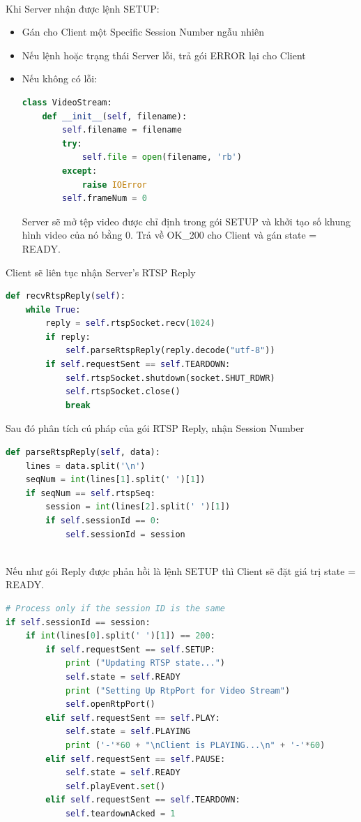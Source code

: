 \documentclass[a4paper]{article}
\begin{document}
\\
Khi Server nhận được lệnh SETUP:
\begin{itemize}
    \item Gán cho Client một Specific Session Number ngẫu nhiên
    \item Nếu lệnh hoặc trạng thái Server lỗi, trả gói ERROR lại cho Client
    \item Nếu không có lỗi:\\
    \begin{lstlisting}[language=Python]
class VideoStream:
    def __init__(self, filename):
        self.filename = filename
        try:
    	    self.file = open(filename, 'rb')
        except:
    	    raise IOError
        self.frameNum = 0
    \end{lstlisting}
    \tab Server sẽ mở tệp video được chỉ định trong gói SETUP và khởi tạo số khung hình video của nó bằng 0.
    \tab Trả về OK\_200 cho Client và gán state = READY.
\end{itemize}
Client sẽ liên tục nhận Server's RTSP Reply
\begin{lstlisting}[language=Python]
def recvRtspReply(self):
    while True:
        reply = self.rtspSocket.recv(1024)
        if reply:
            self.parseRtspReply(reply.decode("utf-8"))
        if self.requestSent == self.TEARDOWN:
            self.rtspSocket.shutdown(socket.SHUT_RDWR)
            self.rtspSocket.close()
            break
\end{lstlisting}
Sau đó phân tích cú pháp của gói RTSP Reply, nhận Session Number
\begin{lstlisting}[language=Python]
def parseRtspReply(self, data):
    lines = data.split('\n')
    seqNum = int(lines[1].split(' ')[1])
    if seqNum == self.rtspSeq:
        session = int(lines[2].split(' ')[1])
        if self.sessionId == 0:
            self.sessionId = session
\end{lstlisting}
\\
Nếu như gói Reply được phản hồi là lệnh SETUP thì Client sẽ đặt giá trị state = READY.
\begin{lstlisting}[language=Python]
# Process only if the session ID is the same
if self.sessionId == session:
    if int(lines[0].split(' ')[1]) == 200:
        if self.requestSent == self.SETUP:
            print ("Updating RTSP state...")
            self.state = self.READY
            print ("Setting Up RtpPort for Video Stream")
            self.openRtpPort() 
        elif self.requestSent == self.PLAY:
            self.state = self.PLAYING
            print ('-'*60 + "\nClient is PLAYING...\n" + '-'*60)
        elif self.requestSent == self.PAUSE:
            self.state = self.READY
            self.playEvent.set()
        elif self.requestSent == self.TEARDOWN:
            self.teardownAcked = 1 
\end{lstlisting}
\end{document}

